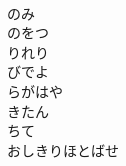 \documentclass[10pt,b5j]{tarticle} %
\begin{document}
\begin{enumerate}
\begin{minipage}[c]{\blocksize}
        \vspace{\linespace}
        \item~\\
        のみ\\
        のをつ\\
        りれり\\
        びでよ\\
        らがはや\\
        きたん\\
        ちて\\
        おしきりほとばせ
    
    \end{minipage}
\end{enumerate} %
\end{document}
